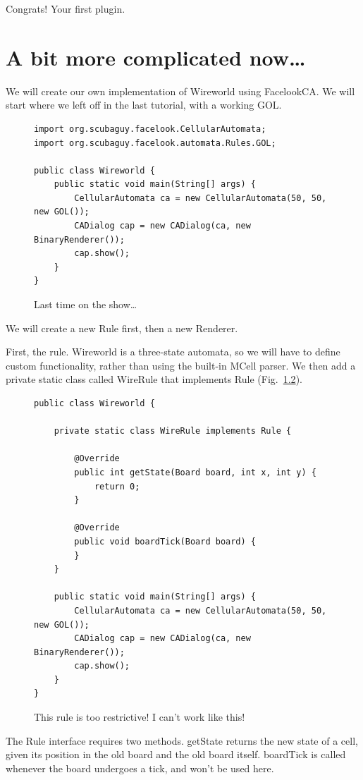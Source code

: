 \documentclass{report}
\begin{document}
Congrats! Your first plugin.
\chapter{A bit more complicated now\ldots}
We will create our own implementation of Wireworld using FacelookCA. We will
start where we left off in the last tutorial, with a working GOL.
\begin{figure}[H]
\begin{lstlisting}
import org.scubaguy.facelook.CellularAutomata;
import org.scubaguy.facelook.automata.Rules.GOL;

public class Wireworld {
    public static void main(String[] args) {
        CellularAutomata ca = new CellularAutomata(50, 50, new GOL());
        CADialog cap = new CADialog(ca, new BinaryRenderer());
        cap.show();
    }
}
\end{lstlisting}
\caption{Last time on the show\ldots}
\label{code:last}
\end{figure}


We will create a new Rule first, then a new Renderer.


First, the rule. Wireworld is a three-state automata, so we will have to define
custom functionality, rather than using the built-in MCell parser. We then add
a private static class called WireRule that implements Rule
(Fig.~\ref{code:startingRules}).
\begin{figure}[H]
\begin{lstlisting}
public class Wireworld {

    private static class WireRule implements Rule {

        @Override
        public int getState(Board board, int x, int y) {
        	return 0;
        }

        @Override
        public void boardTick(Board board) {
        }
    }
    
    public static void main(String[] args) {
        CellularAutomata ca = new CellularAutomata(50, 50, new GOL());
        CADialog cap = new CADialog(ca, new BinaryRenderer());
        cap.show();
    }
}
\end{lstlisting}
\caption{This rule is too restrictive! I can't work like this!}
\label{code:startingRules}
\end{figure}


The Rule interface requires two methods. getState returns the new state of a
cell, given its position in the old board and the old board itself. boardTick is
called whenever the board undergoes a tick, and won't be used here.
\end{document}
